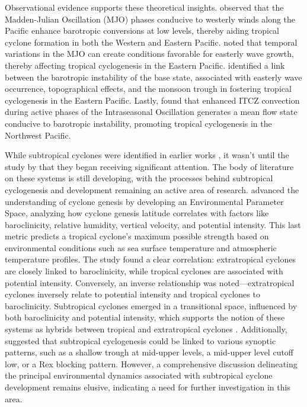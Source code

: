 Observational evidence supports these theoretical insights. \citet{maloney2001madden} observed that the Madden-Julian Oscillation (MJO) phases conducive to westerly winds along the Pacific enhance barotropic conversions at low levels, thereby aiding tropical cyclone formation in both the Western and Eastern Pacific. \citet{molinari1997potential} noted that temporal variations in the MJO can create conditions favorable for easterly wave growth, thereby affecting tropical cyclogenesis in the Eastern Pacific. \citet{molinari2000origins} identified a link between the barotropic instability of the base state, associated with easterly wave occurrence, topographical effects, and the monsoon trough in fostering tropical cyclogenesis in the Eastern Pacific. Lastly, \citet{cao2012modulation} found that enhanced ITCZ convection during active phases of the Intraseasonal Oscillation generates a mean flow state conducive to barotropic instability, promoting tropical cyclogenesis in the Northwest Pacific.

While subtropical cyclones were identified in earlier works \citep{simpson1952evolution}, it wasn't until the study by \citet{hart2003cyclone} that they began receiving significant attention. The body of literature on these systems is still developing, with the processes behind subtropical cyclogenesis and development remaining an active area of research. \citet{yanase2014parameter} advanced the understanding of cyclone genesis by developing an Environmental Parameter Space, analyzing how cyclone genesis latitude correlates with factors like baroclinicity, relative humidity, vertical velocity, and potential intensity. This last metric predicts a tropical cyclone's maximum possible strength based on environmental conditions such as sea surface temperature and atmospheric temperature profiles. The study found a clear correlation: extratropical cyclones are closely linked to baroclinicity, while tropical cyclones are associated with potential intensity. Conversely, an inverse relationship was noted—extratropical cyclones inversely relate to potential intensity and tropical cyclones to baroclinicity. Subtropical cyclones emerged in a transitional space, influenced by both baroclinicity and potential intensity, which supports the notion of these systems as hybrids between tropical and extratropical cyclones \citep[e.g]{hart2003cyclone}. Additionally, \citet{da2019subtropical} suggested that subtropical cyclogenesis could be linked to various synoptic patterns, such as a shallow trough at mid-upper levels, a mid-upper level cutoff low, or a Rex blocking pattern. However, a comprehensive discussion delineating the principal environmental dynamics associated with subtropical cyclone development remains elusive, indicating a need for further investigation in this area.

